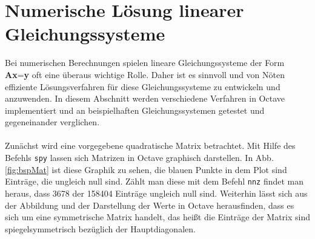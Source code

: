 \section{Numerische Lösung linearer Gleichungssysteme}
Bei numerischen Berechnungen spielen lineare Gleichungssysteme der Form \textbf{Ax}=\textbf{y} oft eine überaus wichtige Rolle. Daher ist es sinnvoll und von Nöten effiziente Lösungsverfahren für diese Gleichungssysteme zu entwickeln und anzuwenden. In diesem Abschnitt werden verschiedene Verfahren in Octave implementiert und an beispielhaften Gleichungssystemen getestet und gegeneinander verglichen.\\ \\
Zunächst wird eine vorgegebene quadratische Matrix betrachtet. Mit Hilfe des Befehls \texttt{spy} lassen sich Matrizen in Octave graphisch darstellen. In Abb. \ref{fig:bspMat} ist diese Graphik zu sehen, die blauen Punkte in dem Plot sind Einträge, die ungleich null sind. Zählt man diese mit dem Befehl \texttt{nnz} findet man heraus, dass 3678 der 158404 Einträge ungleich null sind. Weiterhin lässt sich aus der Abbildung und der Darstellung der Werte in Octave herausfinden, dass es sich um eine symmetrische Matrix handelt, das heißt die Einträge der Matrix sind spiegelsymmetrisch bezüglich der Hauptdiagonalen. \\ \\
